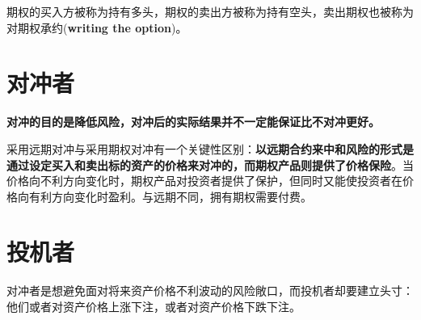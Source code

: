 期权的买入方被称为持有多头，期权的卖出方被称为持有空头，卖出期权也被称为对期权承约(\textbf{writing the option})。
\section{对冲者}
\textbf{对冲的目的是降低风险，对冲后的实际结果并不一定能保证比不对冲更好。}

采用远期对冲与采用期权对冲有一个关键性区别：\textbf{以远期合约来中和风险的形式是通过设定买入和卖出标的资产的价格来对冲的，而期权产品则提供了价格保险}。当价格向不利方向变化时，期权产品对投资者提供了保护，但同时又能使投资者在价格向有利方向变化时盈利。与远期不同，拥有期权需要付费。
\section{投机者}
对冲者是想避免面对将来资产价格不利波动的风险敞口，而投机者却要建立头寸：他们或者对资产价格上涨下注，或者对资产价格下跌下注。